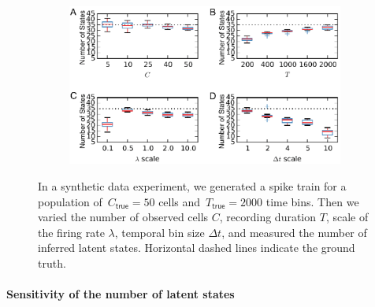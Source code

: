 \begin{figure}  
  \centering
  \begin{subfigure}[t]{5in}
    \includegraphics[width=\textwidth]{figures/ch5/Fig3}
  \end{subfigure}
  \caption{In a synthetic data experiment, we generated a spike train for a population of~$C_{\textsf{true}}=50$ cells and~$T_{\textsf{true}}=2000$ time bins. Then we varied the number of observed cells $C$, recording duration $T$, scale of the firing rate $\lambda$, temporal bin size $\Delta t$, and measured the number of inferred latent states. Horizontal dashed lines indicate the ground truth.}
  \label{fig3}
\end{figure}


\paragraph{Sensitivity of the number of latent states} 


